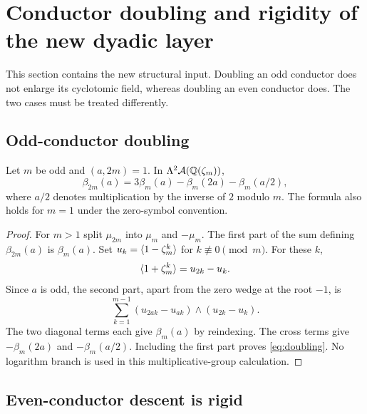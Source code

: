\section{Conductor doubling and rigidity of the new dyadic layer}
\label{sec:dyadic}

This section contains the new structural input. Doubling an odd conductor
does not enlarge its cyclotomic field, whereas doubling an even conductor
does. The two cases must be treated differently.

\subsection{Odd-conductor doubling}

\begin{theorem}\label{thm:doubling}
Let $m$ be odd and $(a,2m)=1$. In
$\Lambda^2\mathcal A(\mathbb Q(\zeta_m))$,
\begin{equation}\label{eq:doubling}
 \beta_{2m}(a)=3\beta_m(a)-\beta_m(2a)-\beta_m(a/2),
\end{equation}
where $a/2$ denotes multiplication by the inverse of $2$ modulo $m$.
The formula also holds for $m=1$ under the zero-symbol convention.
\end{theorem}
\begin{proof}
For $m>1$ split $\mu_{2m}$ into $\mu_m$ and $-\mu_m$. The first
part of the sum defining $\beta_{2m}(a)$ is $\beta_m(a)$. Set
$u_k=\langle 1-\zeta_m^k\rangle$ for $k\not\equiv0\pmod m$. For these $k$,
\[
 \langle 1+\zeta_m^k\rangle=u_{2k}-u_k.
\]
Since $a$ is odd, the second part, apart from the zero wedge at the root
$-1$, is
\[
 \sum_{k=1}^{m-1}(u_{2ak}-u_{ak})\wedge(u_{2k}-u_k).
\]
The two diagonal terms each give $\beta_m(a)$ by reindexing. The cross
terms give $-\beta_m(2a)$ and $-\beta_m(a/2)$. Including the first
part proves \eqref{eq:doubling}. No logarithm branch is used in this
multiplicative-group calculation.
\end{proof}

\subsection{Even-conductor descent is rigid}

